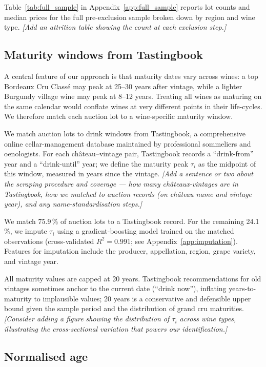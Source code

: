 \noindent Table~\ref{tab:full_sample} in Appendix~\ref{app:full_sample} reports lot counts
and median prices for the full pre-exclusion sample broken down by region and wine type.
\textit{[Add an attrition table showing the count at each exclusion step.]}

\subsection{Maturity windows from Tastingbook}
\label{sec:data:tastingbook}

A central feature of our approach is that maturity dates vary across wines: a top Bordeaux
Cru Classé may peak at 25--30 years after vintage, while a lighter Burgundy village wine may
peak at 8--12 years. Treating all wines as maturing on the same calendar would conflate wines
at very different points in their life-cycles. We therefore match each auction lot to a
wine-specific maturity window.

We match auction lots to drink windows from Tastingbook, a comprehensive online
cellar-management database maintained by professional sommeliers and oenologists.
For each château--vintage pair, Tastingbook records a ``drink-from'' year and a
``drink-until'' year; we define the maturity peak $\tau_i$ as the midpoint of this window,
measured in years since the vintage.
\textit{[Add a sentence or two about the scraping procedure and coverage — how many
châteaux-vintages are in Tastingbook, how we matched to auction records (on château name
and vintage year), and any name-standardisation steps.]}

We match 75.9\,\% of auction lots to a Tastingbook record. For the remaining 24.1\,\%, we
impute $\tau_i$ using a gradient-boosting model trained on the matched observations
(cross-validated $R^2 = 0.991$; see Appendix~\ref{app:imputation}). Features for
imputation include the producer, appellation, region, grape variety, and vintage year.

All maturity values are capped at 20 years. Tastingbook recommendations for old vintages
sometimes anchor to the current date (``drink now''), inflating years-to-maturity to
implausible values; 20 years is a conservative and defensible upper bound given the
sample period and the distribution of grand cru maturities.
\textit{[Consider adding a figure showing the distribution of $\tau_i$ across wine types,
illustrating the cross-sectional variation that powers our identification.]}

\subsection{Normalised age}

